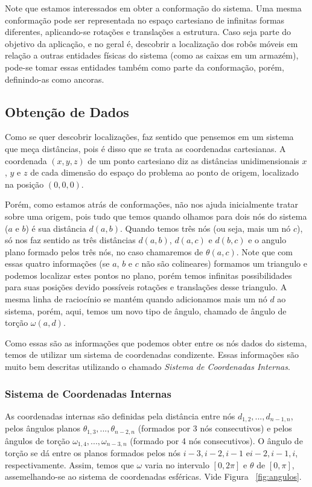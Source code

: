 \documentclass[11pt]{article}
\begin{document}
Note que estamos interessados em obter a conformação do sistema. Uma mesma conformação pode ser representada no espaço cartesiano de infinitas formas diferentes, aplicando-se rotações e translações a estrutura. Caso seja parte do objetivo da aplicação, e no geral é, descobrir a localização dos robôs móveis em relação a outras entidades físicas do sistema (como as caixas em um armazém), pode-se tomar essas entidades também como parte da conformação, porém, definindo-as como ancoras.

\subsection{Obtenção de Dados}
Como se quer descobrir localizações, faz sentido que pensemos em um sistema que meça distâncias, pois é disso que se trata as coordenadas cartesianas. A coordenada $(x, y, z)$ de um ponto cartesiano diz as distâncias unidimensionais $x$, $y$ e $z$ de cada dimensão do espaço do problema ao ponto de origem, localizado na posição $(0, 0, 0)$. 

Porém, como estamos atrás de conformações, não nos ajuda inicialmente tratar sobre uma origem, pois tudo que temos quando olhamos para dois nós do sistema ($a$ e $b$) é sua distância $d(a,b)$. Quando temos três nós (ou seja, mais um nó $c$), só nos faz sentido as três distâncias $d(a,b)$, $d(a,c)$ e $d(b,c)$ e o angulo plano formado pelos três nós, no caso chamaremos de $\theta(a,c)$. Note que com essas quatro informações (se $a$, $b$ e $c$ não são colineares) formamos um triangulo e podemos localizar estes pontos no plano, porém temos infinitas possibilidades para suas posições devido possíveis rotações e translações desse triangulo. A mesma linha de raciocínio se mantém quando adicionamos mais um nó $d$ ao sistema, porém, aqui, temos um novo tipo de ângulo, chamado de ângulo de torção $\omega(a,d)$.

Como essas são as informações que podemos obter entre os nós dados do sistema, temos de utilizar um sistema de coordenadas condizente. Essas informações são muito bem descritas utilizando o chamado \textit{Sistema de Coordenadas Internas}.

\subsubsection{Sistema de Coordenadas Internas}

As coordenadas internas são definidas pela distância entre nós $d_{1,2}, ..., d_{n - 1,n}$, pelos ângulos planos $\theta_{1,3}, ...,\theta_{n - 2,n}$ (formados por 3 nós consecutivos) e pelos ângulos de torção $\omega_{1,4}, ..., \omega_{n-3,n}$ (formado por 4 nós consecutivos). O ângulo de torção se dá entre os planos formados pelos nós $i-3,i-2,i-1$ e$i-2,i-1,i$, respectivamente. Assim, temos que $\omega$ varia no intervalo $[0,2\pi]$ e $\theta$ de $[0,\pi]$, assemelhando-se ao sistema de coordenadas esféricas. Vide Figura ~\ref{fig:angulos}.
\\
\end{document}
